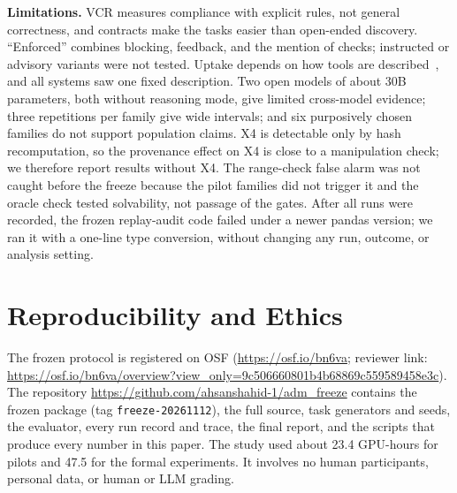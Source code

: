 \documentclass[conference]{IEEEtran}
\begin{document}
\textbf{Limitations.} VCR measures compliance with explicit rules, not general correctness, and contracts make the tasks
easier than open-ended discovery. ``Enforced'' combines blocking, feedback, and the mention of checks; instructed or
advisory variants were not tested. Uptake depends on how tools are described~\cite{faghih2025toolprefs}, and all
systems saw one fixed description. Two open models of about 30B parameters, both without reasoning mode, give limited
cross-model evidence; three repetitions per family give wide intervals; and six purposively chosen families do not
support population claims. X4 is detectable only by hash recomputation, so the provenance effect on X4 is close to a
manipulation check; we therefore report results without X4. The range-check false alarm was not caught before the
freeze because the pilot families did not trigger it and the oracle check tested solvability, not passage of the
gates. After all runs were recorded, the frozen replay-audit code failed under a newer pandas version; we ran it with
a one-line type conversion, without changing any run, outcome, or analysis setting.

\section{Reproducibility and Ethics}
The frozen protocol is registered on OSF (\url{https://osf.io/bn6va}; reviewer link:
\url{https://osf.io/bn6va/overview?view_only=9c506660801b4b68869c559589458e3c}). The repository
\url{https://github.com/ahsanshahid-1/adm_freeze} contains the frozen package (tag \texttt{freeze-20261112}), the full
source, task generators and seeds, the evaluator, every run record and trace, the final report, and the scripts that
produce every number in this paper. The study used about 23.4 GPU-hours for pilots and 47.5 for the formal
experiments. It involves no human participants, personal data, or human or LLM grading.

\end{document}
